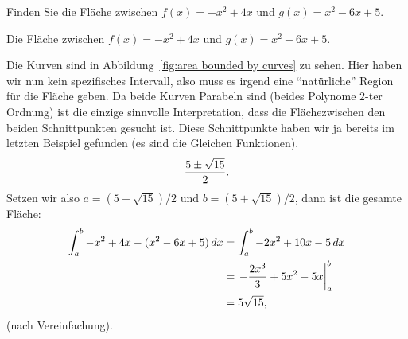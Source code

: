 \begin{example} Finden Sie die Fläche zwischen $f(x)= -x^2+4x$ und
$g(x)=x^2-6x+5$.
\end{example}
\newpage
\begin{marginfigure}
\caption{Die Fläche zwischen $f(x)= -x^2+4x$ und $g(x)=x^2-6x+5$.}
\label{fig:area bounded by curves}
\end{marginfigure}

\begin{solution}
Die Kurven sind in Abbildung~\ref{fig:area bounded by curves} zu sehen. Hier haben wir nun kein spezifisches Intervall, also muss es irgend eine ``natürliche'' Region für die Fläche geben. Da beide Kurven Parabeln sind (beides Polynome $2$-ter Ordnung) ist die einzige sinnvolle Interpretation, dass die Flächezwischen den beiden Schnittpunkten gesucht ist. Diese Schnittpunkte haben wir ja bereits im letzten Beispiel gefunden (es sind die Gleichen Funktionen).
$${5\pm\sqrt{15}\over2}.$$
Setzen wir also $a=(5-\sqrt{15})/2$ und $b=(5+\sqrt{15})/2$,
dann ist die gesamte Fläche: 
\begin{align*}
  \int_a^b -x^2+4x-(x^2-6x+5)\, d x
  &=\int_a^b -2x^2+10x-5\, d x \\
  &=\left.-{2x^3\over3}+5x^2-5x\right|_a^b \\
  &=5\sqrt{15},
\end{align*}
(nach Vereinfachung).
\end{solution}



